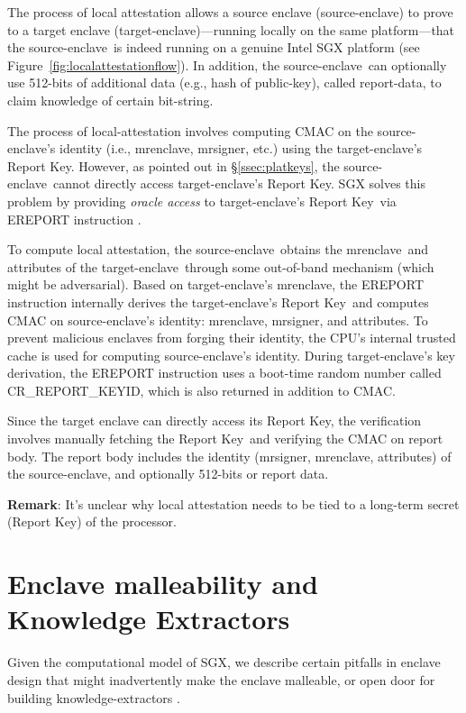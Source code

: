 \documentclass[letterpaper]{article}
\newcommand{\secref}[1]{\S\ref{#1}}
\newcommand{\mrenclave}{\textsf{mrenclave}}
\newcommand{\mrsigner}{\textsf{mrsigner}}
\newcommand{\se}{source-enclave}
\newcommand{\te}{target-enclave}
\newcommand{\rk}{\textsf{Report Key}}
\begin{document}
  The process of local attestation allows a source enclave (\se) to
  prove to a target enclave (\te)---running locally on the same
  platform---that the \se\ is indeed running on a genuine Intel SGX
  platform (see Figure~\ref{fig:localattestationflow}). In addition,
  the \se\ can optionally use 512-bits of additional data (e.g., hash
  of public-key), called report-data, to claim knowledge of certain
  bit-string.

  The process of local-attestation involves computing \textsf{CMAC}
  \cite{aescmac} on the \se's identity (i.e., \mrenclave, \mrsigner,
  etc.) using the \te's \rk. However, as pointed out in
  \secref{ssec:platkeys}, the \se\ cannot directly access \te's
  \rk. SGX solves this problem by providing \textit{oracle access} to
  \te's \rk\ via \textsf{EREPORT} instruction
  \cite[\S14.4.1]{intelsdm}.

  To compute local attestation, the \se\ obtains the \mrenclave\ and
  attributes of the \te\ through some out-of-band mechanism (which
  might be adversarial). Based on \te's \mrenclave, the
  \textsf{EREPORT} instruction internally derives the \te's \rk\ and
  computes \textsf{CMAC} on \se's identity: \mrenclave, \mrsigner, and
  attributes. To prevent malicious enclaves from forging their
  identity, the CPU's internal trusted cache is used for computing
  \se's identity. During \te's key derivation, the \textsf{EREPORT}
  instruction uses a boot-time random number called
  \textsf{CR\_REPORT\_KEYID}, which is also returned in addition to
  \textsf{CMAC}.

  Since the target enclave can directly access its \rk, the
  verification involves manually fetching the \rk\ and verifying the
  \textsf{CMAC} on report body. The report body includes the identity
  (\mrsigner, \mrenclave, attributes) of the \se, and optionally
  512-bits or report data.

  \textbf{Remark}: It's unclear why local attestation needs to be tied
  to a long-term secret (\rk) of the processor.

  \section{Enclave malleability and Knowledge Extractors}
  \label{sec:analysisfwk}

  Given the computational model of SGX, we describe certain pitfalls
  in enclave design that might inadvertently  make  the  enclave
  malleable, or open door for building knowledge-extractors
  \cite{BellarePOK}.
\end{document}
